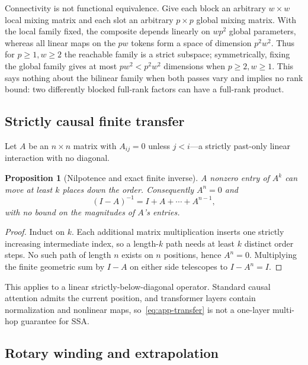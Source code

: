 \documentclass[11pt]{article}
\numberwithin{equation}{section}
\newtheorem{proposition}{Proposition}
\begin{document}
Connectivity is not functional equivalence. Give each block an arbitrary $w\times w$ local mixing matrix and
each slot an arbitrary $p\times p$ global mixing matrix. With the local family fixed, the composite depends
linearly on $wp^2$ global parameters, whereas all linear maps on the $pw$ tokens form a space of dimension
$p^2w^2$. Thus for $p\ge1,w\ge2$ the reachable family is a strict subspace; symmetrically, fixing the global
family gives at most $pw^2<p^2w^2$ dimensions when $p\ge2,w\ge1$. This says nothing about the bilinear family
when both passes vary and implies no rank bound: two differently blocked full-rank factors can have a
full-rank product.

\subsection{Strictly causal finite transfer}

Let $A$ be an $n\times n$ matrix with $A_{ij}=0$ unless $j<i$---a strictly past-only linear interaction with no
diagonal.

\begin{proposition}[Nilpotence and exact finite inverse]\label{prop:app-transfer}
A nonzero entry of $A^k$ can move at least $k$ places down the order. Consequently $A^n=0$ and
\begin{equation}\label{eq:app-transfer}
(I-A)^{-1}=I+A+\cdots+A^{n-1},
\end{equation}
with no bound on the magnitudes of $A$'s entries.
\end{proposition}
\begin{proof}
Induct on $k$. Each additional matrix multiplication inserts one strictly increasing intermediate index, so a
length-$k$ path needs at least $k$ distinct order steps. No such path of length $n$ exists on $n$ positions,
hence $A^n=0$. Multiplying the finite geometric sum by $I-A$ on either side telescopes to $I-A^n=I$.
\end{proof}

This applies to a linear strictly-below-diagonal operator. Standard causal attention admits the current
position, and transformer layers contain normalization and nonlinear maps, so~\eqref{eq:app-transfer} is not
a one-layer multi-hop guarantee for SSA.

\subsection{Rotary winding and extrapolation}
\end{document}
